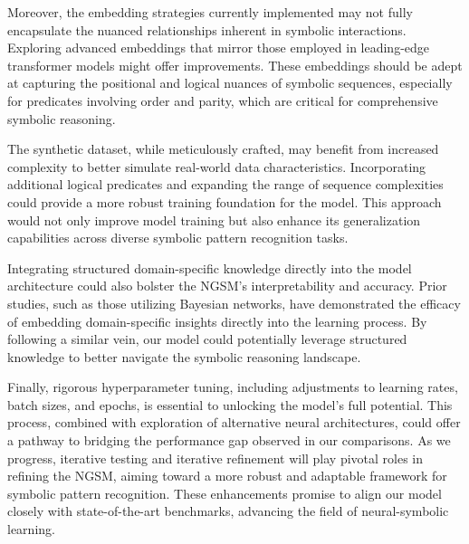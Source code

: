 \documentclass{article}
\begin{document}
Moreover, the embedding strategies currently implemented may not fully encapsulate the nuanced relationships inherent in symbolic interactions. Exploring advanced embeddings that mirror those employed in leading-edge transformer models might offer improvements. These embeddings should be adept at capturing the positional and logical nuances of symbolic sequences, especially for predicates involving order and parity, which are critical for comprehensive symbolic reasoning.

The synthetic dataset, while meticulously crafted, may benefit from increased complexity to better simulate real-world data characteristics. Incorporating additional logical predicates and expanding the range of sequence complexities could provide a more robust training foundation for the model. This approach would not only improve model training but also enhance its generalization capabilities across diverse symbolic pattern recognition tasks.

Integrating structured domain-specific knowledge directly into the model architecture could also bolster the NGSM's interpretability and accuracy. Prior studies, such as those utilizing Bayesian networks, have demonstrated the efficacy of embedding domain-specific insights directly into the learning process. By following a similar vein, our model could potentially leverage structured knowledge to better navigate the symbolic reasoning landscape.

Finally, rigorous hyperparameter tuning, including adjustments to learning rates, batch sizes, and epochs, is essential to unlocking the model's full potential. This process, combined with exploration of alternative neural architectures, could offer a pathway to bridging the performance gap observed in our comparisons. As we progress, iterative testing and iterative refinement will play pivotal roles in refining the NGSM, aiming toward a more robust and adaptable framework for symbolic pattern recognition. These enhancements promise to align our model closely with state-of-the-art benchmarks, advancing the field of neural-symbolic learning.
\end{document}

